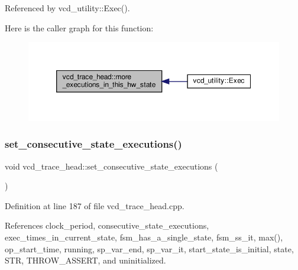 Referenced by vcd\+\_\+utility\+::\+Exec().

Here is the caller graph for this function\+:
\nopagebreak
\begin{figure}[H]
\begin{center}
\leavevmode
\includegraphics[width=350pt]{df/d30/structvcd__trace__head_afaca372a204f448329b859a6f1e19b6c_icgraph}
\end{center}
\end{figure}
\mbox{\label{structvcd__trace__head_acdcc6eecd8b483590b6974d51cc9a8fc}} 
\subsubsection{\texorpdfstring{set\+\_\+consecutive\+\_\+state\+\_\+executions()}{set\_consecutive\_state\_executions()}}
{\footnotesize\ttfamily void vcd\+\_\+trace\+\_\+head\+::set\+\_\+consecutive\+\_\+state\+\_\+executions (\begin{DoxyParamCaption}{ }\end{DoxyParamCaption})\hspace{0.3cm}{\ttfamily [protected]}}



Definition at line 187 of file vcd\+\_\+trace\+\_\+head.\+cpp.



References clock\+\_\+period, consecutive\+\_\+state\+\_\+executions, exec\+\_\+times\+\_\+in\+\_\+current\+\_\+state, fsm\+\_\+has\+\_\+a\+\_\+single\+\_\+state, fsm\+\_\+ss\+\_\+it, max(), op\+\_\+start\+\_\+time, running, sp\+\_\+var\+\_\+end, sp\+\_\+var\+\_\+it, start\+\_\+state\+\_\+is\+\_\+initial, state, S\+TR, T\+H\+R\+O\+W\+\_\+\+A\+S\+S\+E\+RT, and uninitialized.



